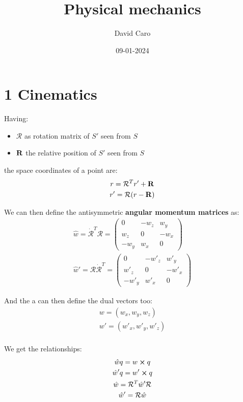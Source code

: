 \documentclass[a4paper,landscape,10pt]{cheatsheet}
\title{Physical mechanics}
\author{David Caro}
\date{09-01-2024}
\begin{document}
\maketitle

\section{1 Cinematics}
Having:
\begin{itemize}
  \item $\mathcal{R}$ as rotation matrix of $S'$ seen from $S$
  \item $\bf{R}$ the relative position of $S'$ seen from $S$
\end{itemize}
the space coordinates of a point are:
\begin{gather*}
  r = \mathcal{R}^T r' + \bf{R} \\
  r'= \mathcal{R}(r - \bf{R})
\end{gather*}

We can then define the antisymmetric \textbf{angular momentum matrices} as:
\begin{gather*}
  \hat{w} = \mathcal{\dot{R}}^T\mathcal{R} = \begin{pmatrix}
    0    & -w_z & w_y  \\
    w_z  & 0    & -w_x \\
    -w_y & w_x  & 0
  \end{pmatrix} \\
  \hat{w}' = \mathcal{R}\mathcal{\dot{R}}^T = \begin{pmatrix}
    0     & -w'_z & w'_y  \\
    w'_z  & 0     & -w'_x \\
    -w'_y & w'_x  & 0
  \end{pmatrix}
\end{gather*}

And the a can then define the dual vectors too:
\begin{gather*}
  w = (w_x, w_y, w_z)\\
  w' = (w'_x, w'_y, w'_z)\\
\end{gather*}

We get the relationships:
\begin{gather*}
  \hat{w}q = w \cross q \\
  \hat{w}'q = w' \cross q \\
  \hat{w} = \mathcal{R}^T\hat{w}'\mathcal{R} \\
  \hat{w}' = \mathcal{R}\hat{w}
\end{gather*}
\end{document}
